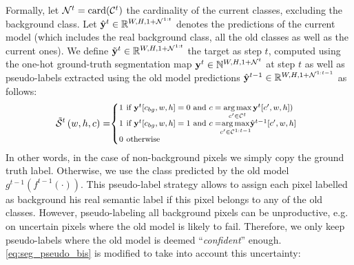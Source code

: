 Formally, let $\mathcal{N}^t=\operatorname{card}(\mathcal{C}^{t})$ the cardinality of the current classes,
excluding the background class. Let $\hat{\mathbf{y}}^{t} \in \mathbb{R}^{W,H,1+\mathcal{N}^{1:t}}$ denotes the
predictions of the current model (which includes the real background class, all the old classes as
well as the current ones). We define $\tilde{\mathbf{y}}^{t} \in \mathbb{R}^{W,H,1+\mathcal{N}^{1:t}}$ the target
as step $t$, computed using the one-hot ground-truth segmentation map $\mathbf{y}^{t} \in
    \mathbb{N}^{W,H,1+\mathcal{N}^t}$ at step $t$ as well as pseudo-labels extracted using the old model
predictions $\hat{\mathbf{y}}^{t-1} \in \mathbb{R}^{W,H,1+\mathcal{N}^{1:t-1}}$ as follows:
%
\begin{equation}
    \footnotesize
    \tilde \mcS^{t}\left(w,h,c\right)= \mkern-5mu \left\{\begin{array}{ll}
        \mkern-10mu 1 \mkern-27mu & \text { if } \vy^{t} [c_{bg},w,h]=0 \text { and } c = \argmax \limits_{c' \in \mcC^{t}} \vy^{t}[c',w,h])                                 \\
        \mkern-10mu 1 \mkern-27mu & \text { if } \vy^{t}[c_{bg},w,h]=1 \text { and } c = \mkern-8mu \argmax \limits_{c' \in \mcC^{1:t-1}} \mkern-6mu \hat{\vy}^{t-1}[c',w,h] \\
        \mkern-10mu 0 \mkern-27mu & \text { otherwise }                                                                                                                      \\
    \end{array}\right.
    \label{eq:seg_pseudo_bis}
\end{equation}
%
In other words, in the case of non-background pixels we simply copy the ground truth label.
Otherwise, we use the class predicted by the old model $g^{t-1}(f^{t-1}(\cdot))$. This pseudo-label
strategy allows to assign each pixel labelled as background his real semantic label if this pixel
belongs to any of the old classes. However, pseudo-labeling all background pixels can be
unproductive, e.g. on uncertain pixels where the old model is likely to fail. Therefore, we only keep
pseudo-labels where the old model is deemed ``\textit{confident}'' enough.
\autoref{eq:seg_pseudo_bis} is modified to take into account this uncertainty:
%
